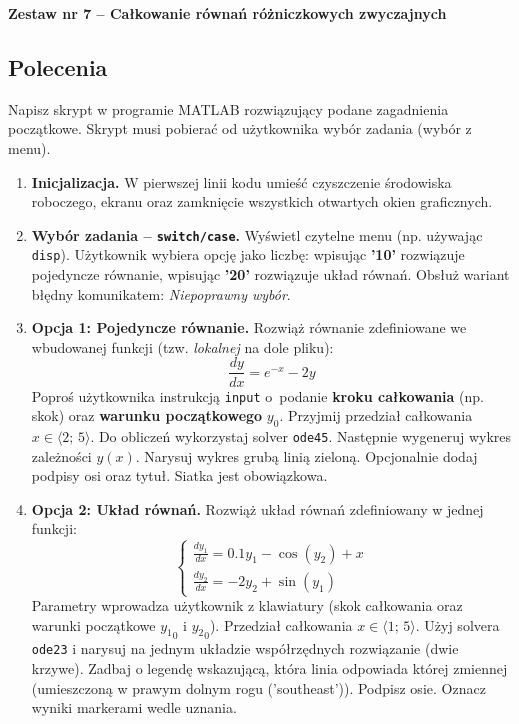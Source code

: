 \documentclass[a4paper,11pt]{article}
\begin{document}
\clearpage
\begin{center}
  {\large\bfseries Zestaw nr 7 \quad -- \quad Całkowanie równań różniczkowych zwyczajnych}
\end{center}
\hrulefill
\vspace{0.4cm}

\subsection*{Polecenia}

Napisz skrypt w programie MATLAB rozwiązujący podane zagadnienia początkowe. Skrypt musi pobierać od użytkownika wybór zadania (wybór z menu).

\begin{enumerate}[leftmargin=*, label=\textbf{\arabic*.}, itemsep=2pt]

  \item \textbf{Inicjalizacja.}
    W pierwszej linii kodu umieść czyszczenie środowiska roboczego, ekranu oraz zamknięcie wszystkich otwartych okien graficznych.

  \item \textbf{Wybór zadania -- \texttt{switch/case}.}
    Wyświetl czytelne menu (np. używając \texttt{disp}). Użytkownik wybiera opcję jako liczbę: wpisując \textbf{'10'} rozwiązuje pojedyncze równanie, wpisując \textbf{'20'} rozwiązuje układ równań. Obsłuż wariant błędny komunikatem: \textit{Niepoprawny wybór}.

  \item \textbf{Opcja 1: Pojedyncze równanie.}
    Rozwiąż równanie zdefiniowane we wbudowanej funkcji (tzw. \textit{lokalnej} na dole pliku):
    \[ \frac{dy}{dx} = e^{-x} - 2y \]
    Poproś użytkownika instrukcją \texttt{input} o~podanie \textbf{kroku całkowania} (np. skok) oraz \textbf{warunku początkowego} $y_0$. Przyjmij przedział całkowania $x \in \langle 2;\,5 \rangle$.
    Do obliczeń wykorzystaj solver \texttt{ode45}. Następnie wygeneruj wykres zależności $y(x)$. Narysuj wykres grubą linią zieloną. Opcjonalnie dodaj podpisy osi oraz tytuł. Siatka jest obowiązkowa.

  \item \textbf{Opcja 2: Układ równań.}
    Rozwiąż układ równań zdefiniowany w jednej funkcji:\\[-0.5em]
    \[
    \begin{cases}
      \frac{dy_1}{dx} = 0.1y_1 - \cos(y_2) + x \\
      \frac{dy_2}{dx} = -2y_2 + \sin(y_1)
    \end{cases}
    \]
    Parametry wprowadza użytkownik z klawiatury (skok całkowania oraz warunki początkowe $ {y_1}_{0} $ i $ {y_2}_{0} $). Przedział całkowania $x \in \langle 1;\,5 \rangle$.
    Użyj solvera \texttt{ode23} i narysuj na jednym układzie współrzędnych rozwiązanie (dwie krzywe). Zadbaj o legendę wskazującą, która linia odpowiada której zmiennej (umieszczoną w prawym dolnym rogu ('southeast')). Podpisz osie. Oznacz wyniki markerami wedle uznania.

\end{enumerate}
\end{document}
